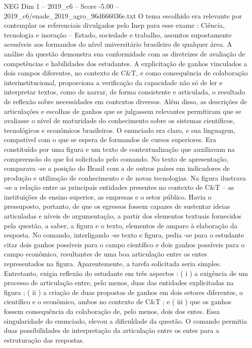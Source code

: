 \begin{textsample}{NEG Dim 1 – 2019\_c6 – Score -5.00 – 2019\_c6/enade\_2019\_agro\_96d666036e.txt}
O tema escolhido era relevante por contemplar os referenciais divulgados pelo Inep para esse exame : Ciência, tecnologia e inovação – Estado, sociedade e trabalho, assuntos supostamente acessíveis aos formandos do nível universitário brasileiro de qualquer área.
A análise da questão demonstra sua conformidade com as diretrizes de avaliação de competências e habilidades dos estudantes.
A explicitação de ganhos vinculados a dois campos diferentes, no contexto de C\&T, e como consequência de colaboração interinstitucional, proporciona a verificação da capacidade não só de ler e interpretar textos, como de narrar, de forma consistente e articulada, o resultado de reflexão sobre necessidades em contextos diversos.
Além disso, as descrições de articulações e escolhas de ganhos que se julgassem relevantes permitiram que se avaliasse o nível de maturidade do conhecimento sobre os sistemas científicos, tecnológicos e econômicos brasileiros.
O enunciado era claro, e sua linguagem, compatível com o que se espera de formandos de cursos superiores.
Era constituído por uma figura e um texto de contextualização que auxiliavam na compreensão do que foi solicitado pelo comando.
No texto de apresentação, comparava -se a posição do Brasil com a de outros países em indicadores de produção e utilização de conhecimento e de novas tecnologias.
Na figura ilustrava -se a relação entre as principais entidades presentes no contexto de C\&T – as instituições de ensino superior, as empresas e o setor público.
Havia o pressuposto, portanto, de que os egressos fossem capazes de sustentar ideias articuladas e níveis de argumentação, a partir dos elementos textuais fornecidos pela questão, a saber, a figura e o texto, elementos de amparo à elaboração da resposta.
No comando, interligando -se texto e figura, pedia -se para o estudante citar dois ganhos possíveis para o campo científico e dois ganhos possíveis para o campo econômico, resultantes de uma boa articulação entre os entes representados na figura.
Aparentemente, a tarefa solicitada seria simples.
Entretanto, exigia reflexão do estudante em três aspectos : ( i ) a exigência de um processo de articulação entre, pelo menos, duas das entidades explicitadas na figura ; ( ii ) a criação de duas propostas de ganhos em dois setores diferentes, o científico e o econômico, ambos no contexto de C\&T ; e ( iii ) que os ganhos fossem consequência da colaboração de, pelo menos, dois dos entes.
Essa singularidade do enunciado, elevou a dificuldade da questão.
O comando permitia duas possibilidades de interpretação da articulação entre os entes para a estruturação das respostas.

\end{textsample}
